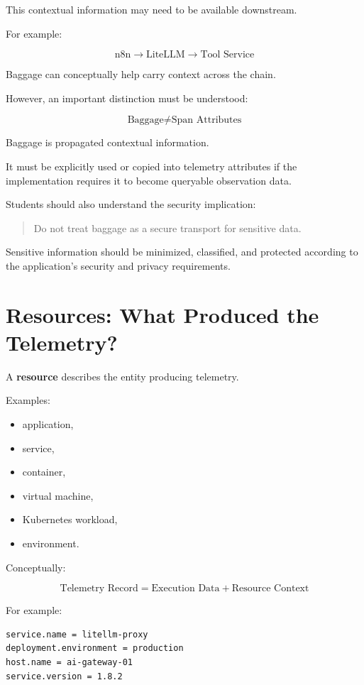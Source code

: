 \documentclass[11pt,a4paper]{article}
\begin{document}
This contextual information may need to be available downstream.

For example:

\[
\text{n8n}
\rightarrow
\text{LiteLLM}
\rightarrow
\text{Tool Service}
\]

Baggage can conceptually help carry context across the chain.

However, an important distinction must be understood:

\[
\boxed{
\text{Baggage} \neq \text{Span Attributes}
}
\]

Baggage is propagated contextual information.

It must be explicitly used or copied into telemetry attributes if the implementation requires it to become queryable observation data.

Students should also understand the security implication:

\begin{quote}
Do not treat baggage as a secure transport for sensitive data.
\end{quote}

Sensitive information should be minimized, classified, and protected according to the application's security and privacy requirements.

\section{Resources: What Produced the Telemetry?}

A \textbf{resource} describes the entity producing telemetry.

Examples:

\begin{itemize}
\item application,
\item service,
\item container,
\item virtual machine,
\item Kubernetes workload,
\item environment.
\end{itemize}

Conceptually:

\[
\text{Telemetry Record} = \text{Execution Data} + \text{Resource Context}
\]

For example:

\begin{lstlisting}
service.name = litellm-proxy
deployment.environment = production
host.name = ai-gateway-01
service.version = 1.8.2
\end{lstlisting}
\end{document}
